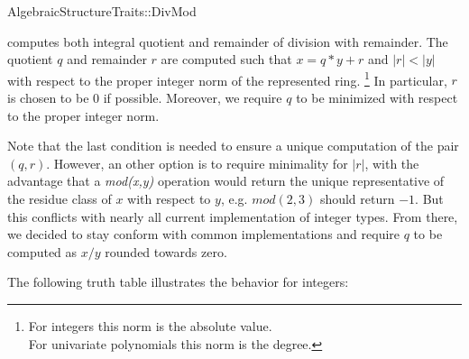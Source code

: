 \begin{ccRefConcept}{AlgebraicStructureTraits::DivMod}

\ccDefinition

 computes both integral quotient and remainder
of division with remainder. The quotient $q$ and remainder $r$ are computed 
such that $x = q*y + r$ and $|r| < |y|$ with respect to the proper integer norm of 
the represented ring.
\footnote{
For integers this norm is the absolute value.\\ 
For univariate polynomials this norm is the degree.} 
In particular, $r$ is chosen to be $0$ if possible.
Moreover, we require $q$ to be minimized with respect to the proper integer norm.  



Note that the last condition is needed to ensure a unique computation of the 
pair $(q,r)$. However, an other option is to require minimality for $|r|$, 
with the advantage that
a {\em mod(x,y)} operation would return the unique representative of the 
residue class of $x$ with respect to $y$, e.g. $mod(2,3)$ should return $-1$. 
But this conflicts with nearly all current implementation 
of integer types. From there, we decided to stay conform with common 
implementations and require $q$ to be computed as $x/y$ rounded towards zero. 


The following truth table illustrates the behavior for integers: 


\end{ccRefConcept}
